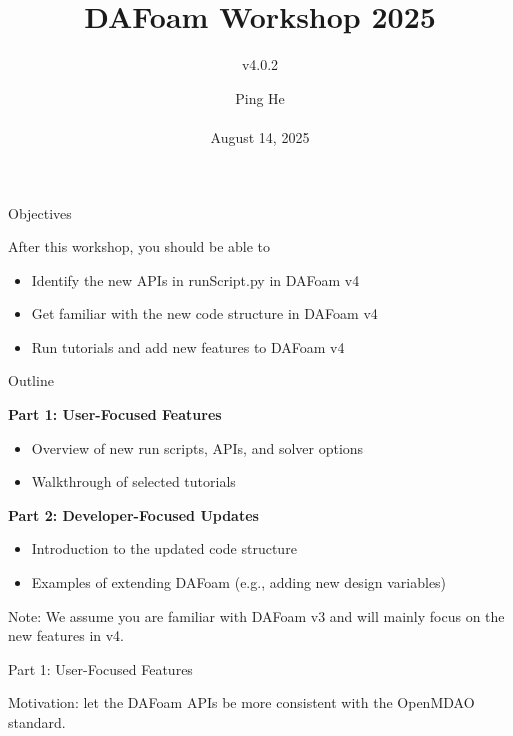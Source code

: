 \documentclass{bredelebeamer}
\title[ ]{DAFoam Workshop 2025}
\subtitle{v4.0.2}
\author{Ping He\\ ~ \\August 14, 2025 }
\date[August 14, 2025]{}
\begin{document}
\begin{frame}
  \titlepage
\end{frame}



\begin{frame}{Objectives}

After this workshop, you should be able to
\begin{itemize}
  \setlength\itemsep{1em}
 \item Identify the new APIs in runScript.py in DAFoam v4
 \item Get familiar with the new code structure in DAFoam v4 
 \item Run tutorials and add new features to DAFoam v4
\end{itemize} 

\end{frame}


\begin{frame}{Outline}

\textbf{Part 1: User-Focused Features}
\begin{itemize}
  \setlength\itemsep{1em}
 \item Overview of new run scripts, APIs, and solver options
 \item Walkthrough of selected tutorials
\end{itemize}

\textbf{Part 2: Developer-Focused Updates}
\begin{itemize}
  \setlength\itemsep{1em}
 \item Introduction to the updated code structure
 \item Examples of extending DAFoam (e.g., adding new design variables)
\end{itemize}

Note: We assume you are familiar with DAFoam v3 and will mainly focus on the new features in v4.

\end{frame}

\begin{frame}{}

  \begin{center}
     \noindent \Large{Part 1: User-Focused Features}
  \end{center}

  \begin{center}
    \noindent \large{Motivation: let the DAFoam APIs be more consistent with the OpenMDAO standard.}
 \end{center}

  

  
  \end{frame}
\end{document}
